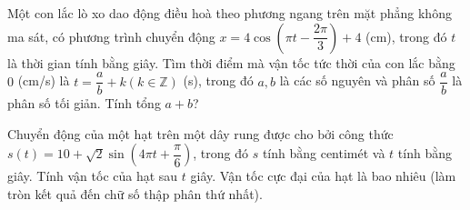 \begin{bt}%

	Một con lắc lò xo dao động điều hoà theo phương ngang trên mặt phẳng không ma sát, có phương trình chuyển động $x=4\cos \left(\pi t-\dfrac{2\pi}{3} \right)+4$ (cm), trong đó $t$ là thời gian tính bằng giây. Tìm thời điểm mà vận tốc tức thời của con lắc bằng $0$ (cm/s) là $t=\dfrac{a}{b}+k(k\in \mathbb{Z})$ (s), trong đó $a,b$ là các số nguyên và phân số $\dfrac{a}{b}$ là phân số tối giản. Tính tổng $a+b$?
\end{bt}

\begin{bt}%
	Chuyển động của một hạt trên một dây rung được cho bởi công thức $ s\left( t \right)=10+\sqrt {2}\sin \left( 4\pi t+\dfrac{\pi }{6} \right)$, trong đó $ s$ tính bằng centimét và $ t$ tính bằng giây. Tính vận tốc của hạt sau $ t$ giây. Vận tốc cực đại của hạt là bao nhiêu (làm tròn kết quả đến chữ số thập phân thứ nhất).\\
\end{bt}

